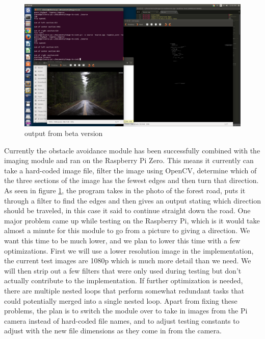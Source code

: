 \documentclass[10pt,letterpaper,onecolumn,draftclsnofoot,journal]{IEEEtran}
\begin{document}
\begin{figure}[H]
	\centering
	\includegraphics[scale = .25]{demo.png}
	\caption{output from beta version}
	\label{fig:beta}
\end{figure}
\par
Currently the obstacle avoidance module has been successfully combined with the imaging module and ran on the Raspberry Pi Zero. This means it currently can take a hard-coded image file, filter the image using OpenCV, determine which of the three sections of the image has the fewest edges and then turn that direction. As seen in figure \ref{fig:beta}, the program takes in the photo of the forest road, puts it through a filter to find the edges and then gives an output stating which direction should be traveled, in this case it said to continue straight down the road. One major problem came up while testing on the Raspberry Pi, which is it would take almost a minute for this module to go from a picture to giving a direction. We want this time to be much lower, and we plan to lower this time with a few optimizations. First we will use a lower resolution image in the implementation, the current test images are 1080p which is much more detail than we need. We will then strip out a few filters that were only used during testing but don't actually contribute to the implementation. If further optimization is needed, there are multiple nested loops that perform somewhat redundant tasks that could potentially merged into a single nested loop. Apart from fixing these problems, the plan is to switch the module over to take in images from the Pi camera instead of hard-coded file names, and to adjust testing constants to adjust with the new file dimensions as they come in from the camera.
\end{document}
